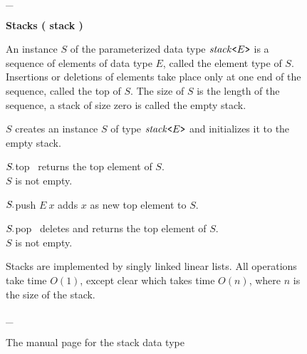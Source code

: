 \begin{latexonly}%
\begin{figure}[t!]
\_\hrulefill

\begin{manual}
{\bf Stacks ( stack )}


An instance \mbox{$S$} of the parameterized data type 
\mbox{$\mathit{stack}\texttt{<} E\texttt{>} $} is a sequence of 
elements of data type \mbox{$E$}, called the element type of \mbox{$S$}. Insertions or
deletions of elements take place only at one end of the sequence, called 
the top of \mbox{$S$}. The size of \mbox{$S$} is the length of the sequence, a stack
of size zero is called the empty stack. 



{\mbox{$S$}} {} {creates an instance \mbox{$S$} of type
\mbox{$\mathit{stack}\texttt{<} E\texttt{>} $} and initializes it to
the empty stack.  }

\setlength{\typewidth}{2.5cm}
\setlength{\callwidth}{4cm}
\computewidths



{\mbox{$S\hspace{-0.09em}.$}top} {$\,$} {returns the top element of \mbox{$S$}.\\
\precond $S$ is not empty.  }

{\mbox{$S\hspace{-0.09em}.$}push} {\mbox{$E\ x$}} {adds $x$ as new top element to
\mbox{$S$}.  }

{\mbox{$S\hspace{-0.09em}.$}pop} {$\,$} {deletes and returns the top element of
\mbox{$S$}.\\ \precond $S$ is not empty.  }


Stacks are implemented by singly linked linear lists. All operations take
time $O(1)$, except clear which takes time $O(n)$, where $n$ is the size of
the stack.
\end{manual}

\_\hrulefill
\caption{The manual page for the stack data type}\label{A Man-Page}
\end{figure}
\end{latexonly}

